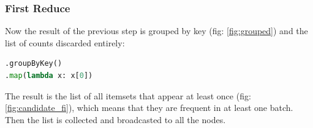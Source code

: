 \documentclass[a4paper]{article}
\begin{document}
	\subsubsection{First Reduce}
	Now the result of the previous step is grouped by key (fig: \ref{fig:grouped}) and the list of counts discarded entirely:
	\begin{lstlisting}[language=Python]
.groupByKey()
.map(lambda x: x[0])
	\end{lstlisting}
	The result is the list of all itemsets that appear at least once (fig: \ref{fig:candidate_fi}), which means that they are frequent in at least one batch.\\
	Then the list is collected and broadcasted to all the nodes.
	
	\begin{figure}[h]
		\centering
		

\end{figure}
\end{document}
